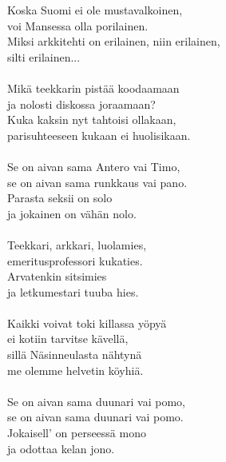 
            Koska Suomi ei ole mustavalkoinen, \\
            voi Mansessa olla porilainen. \\
            Miksi arkkitehti on erilainen, niin erilainen, \\
            silti erilainen... \\
\hspace{10mm} \\
            Mikä teekkarin pistää koodaamaan \\
            ja nolosti diskossa joraamaan? \\
            Kuka kaksin nyt tahtoisi ollakaan, \\
            parisuhteeseen kukaan ei huolisikaan. \\
\hspace{10mm} \\
            Se on aivan sama Antero vai Timo, \\
            se on aivan sama runkkaus vai pano. \\
            Parasta seksii on solo \\
            ja jokainen on vähän nolo. \\
\hspace{10mm} \\
            Teekkari, arkkari, luolamies, \\
            emeritusprofessori kukaties. \\
            Arvatenkin sitsimies \\
            ja letkumestari tuuba hies. \\
\hspace{10mm} \\
            Kaikki voivat toki killassa yöpyä \\
            ei kotiin tarvitse kävellä, \\
            sillä Näsinneulasta nähtynä \\
            me olemme helvetin köyhiä. \\
\hspace{10mm} \\
            Se on aivan sama duunari vai pomo, \\
            se on aivan sama duunari vai pomo. \\
            Jokaisell’ on perseessä mono \\
            ja odottaa kelan jono. \\
